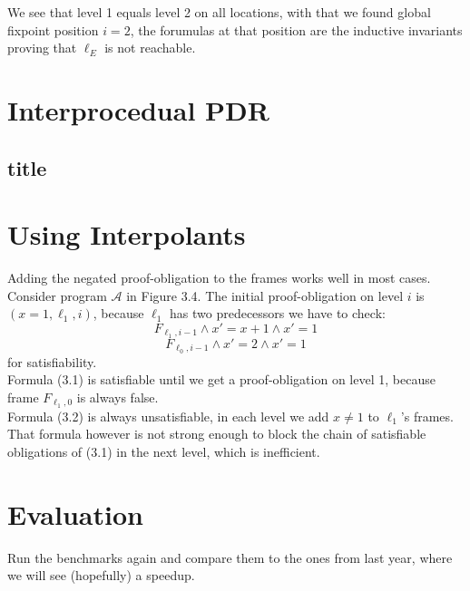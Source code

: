 \documentclass{article}
\begin{document}
	\hspace*{5cm}
	
	We see that level 1 equals level 2 on all locations, with that we found global fixpoint position $i = 2$, the forumulas at that position are the inductive invariants proving that $\ell_E$ is not reachable.
	
	\section{Interprocedual PDR}

	
	\subsection{title}
	
	
	\section{Using Interpolants}
	Adding the negated proof-obligation to the frames works well in most cases. Consider program $\mathcal{A}$ in Figure 3.4. The initial proof-obligation on level $i$ is $(x = 1, \ell_1, i)$, because $\ell_1$ has two predecessors we have to check:
	\begin{equation}
	F_{\ell_1, i - 1} \land x' = x + 1 \land x' = 1
	\end{equation}
	\begin{equation}
	F_{\ell_0, i - 1} \land x' = 2 \land x' = 1
	\end{equation}
	for satisfiability. \\
	Formula (3.1) is satisfiable until we get a proof-obligation on level 1, because frame $F_{\ell_1, 0}$ is always false. \\
	Formula (3.2) is always unsatisfiable, in each level we add $x \neq 1$ to $\ell_1$'s frames. That formula however is not strong enough to block the chain of satisfiable obligations of (3.1) in the next level, which is inefficient.
	
	
	
	\section{Evaluation}
	Run the benchmarks again and compare them to the ones from last year, where we will see (hopefully) a speedup.
	
	\pagebreak
	



	
\end{document}
